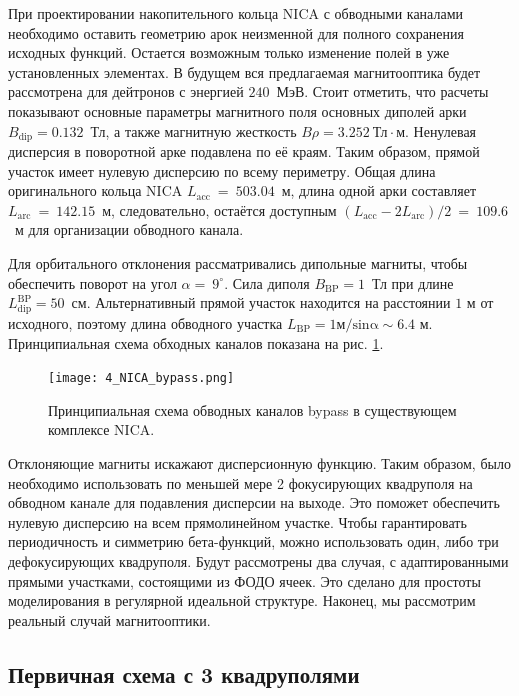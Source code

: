 \par При проектировании накопительного кольца NICA с обводными каналами необходимо оставить геометрию арок неизменной для полного сохранения исходных функций. Остается возможным только изменение полей в уже установленных элементах. В будущем вся предлагаемая магнитооптика будет рассмотрена для дейтронов с энергией $240$~МэВ. Стоит отметить, что расчеты показывают основные параметры магнитного поля основных диполей арки $B_{\textrm{dip}}=0.132$~Тл, а также магнитную жесткость $B\rho=3.252 \ \textrm{Тл} \cdot$м. Ненулевая дисперсия в поворотной арке подавлена по её краям. Таким образом, прямой участок имеет нулевую дисперсию по всему периметру. Общая длина оригинального кольца NICA $L_{\textrm{acc}}~=~503.04$~м, длина одной арки составляет $L_{\textrm{arc}}~=~142.15$~м, следовательно, остаётся доступным $\left(L_{\textrm{acc}}-2L_{\textrm{arc}}\right)/2~=~109.6$~м для организации обводного канала.

\par Для орбитального отклонения рассматривались дипольные магниты, чтобы обеспечить поворот на угол $\alpha=\ 9^{\circ}$. Сила диполя $B_{\textrm{BP}}=1$~Тл при длине $L_{\textrm{dip}}^{\textrm{BP}}=50$~см. Альтернативный прямой участок находится на расстоянии $1$ м от исходного, поэтому длина обводного участка $L_{\textrm{BP}}=1\mathrm{м/sin\alpha}\sim6.4$ м. Принципиальная схема обходных каналов показана на рис. \ref{fig:4_NICA_bypass}.

\begin{figure}[!h]
  \centering
   \texttt{[image: 4\_NICA\_bypass.png]}
   \caption{Принципиальная схема обводных каналов bypass в существующем комплексе NICA.}
   \label{fig:4_NICA_bypass}
\end{figure}

\par Отклоняющие магниты искажают дисперсионную функцию. Таким образом, было необходимо использовать по меньшей мере 2 фокусирующих квадруполя на обводном канале для подавления дисперсии на выходе. Это поможет обеспечить нулевую дисперсию на всем прямолинейном участке. Чтобы гарантировать периодичность и симметрию бета-функций, можно использовать один, либо три дефокусирующих квадруполя. Будут рассмотрены два случая, с адаптированными прямыми участками, состоящими из ФОДО ячеек. Это сделано для простоты моделирования в регулярной идеальной структуре. Наконец, мы рассмотрим реальный случай магнитооптики.

	\subsection{Первичная схема с 3 квадруполями}\label{sec:EDM/Wien_filter/ByPass/3quad}

